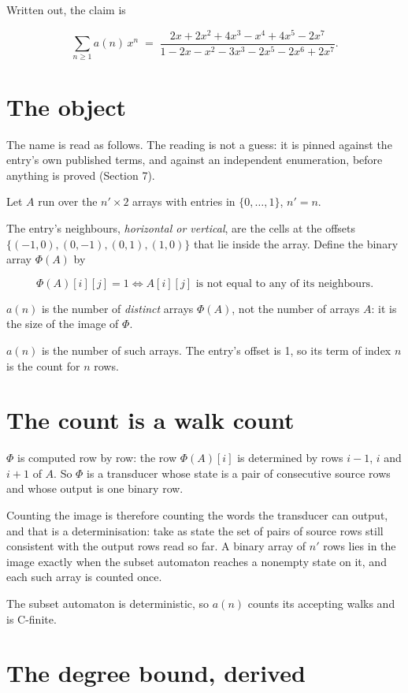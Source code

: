 \documentclass[11pt]{article}
\theoremstyle{definition}
\begin{document}
Written out, the claim is

\[\sum_{n \ge 1} a(n)\,x^n \;=\; \frac{2x + 2x^{2} + 4x^{3} - x^{4} + 4x^{5} - 2x^{7}}{1 - 2x - x^{2} - 3x^{3} - 2x^{5} - 2x^{6} + 2x^{7}}.\]

\section{The object}

The name is read as follows. The reading is not a guess: it is pinned against the entry's own published terms, and against an independent enumeration, before anything is proved (Section 7).

Let $A$ run over the $n' \times 2$ arrays with entries in $\{0,\dots,1\}$, $n' = n$.

The entry's neighbours, {\itshape horizontal or vertical}, are the cells at the offsets $\{(-1,0), (0,-1), (0,1), (1,0)\}$ that lie inside the array. Define the binary array $\Phi(A)$ by

\[\Phi(A)[i][j] = 1 \iff A[i][j] \text{ is not equal to any of its neighbours}.\]

$a(n)$ is the number of {\itshape distinct} arrays $\Phi(A)$, not the number of arrays $A$: it is the size of the image of $\Phi$.

$a(n)$ is the number of such arrays. The entry's offset is 1, so its term of index $n$ is the count for $n$ rows.

\section{The count is a walk count}

$\Phi$ is computed row by row: the row $\Phi(A)[i]$ is determined by rows $i-1$, $i$ and $i+1$ of $A$. So $\Phi$ is a transducer whose state is a pair of consecutive source rows and whose output is one binary row.

Counting the image is therefore counting the words the transducer can output, and that is a determinisation: take as state the set of pairs of source rows still consistent with the output rows read so far. A binary array of $n'$ rows lies in the image exactly when the subset automaton reaches a nonempty state on it, and each such array is counted once.

The subset automaton is deterministic, so $a(n)$ counts its accepting walks and is C-finite.

\section{The degree bound, derived}
\end{document}
